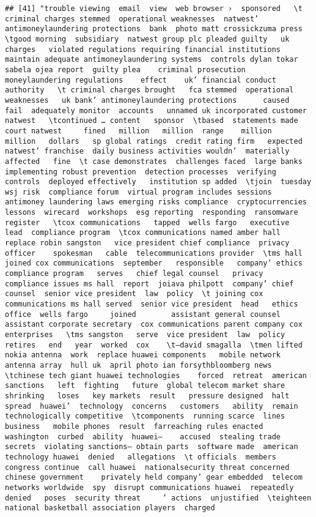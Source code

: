 \documentclass[
]{article}
\begin{document}
\begin{verbatim}
## [41] "trouble viewing  email  view  web browser ›  sponsored   \t criminal charges stemmed  operational weaknesses  natwest’ antimoneylaundering protections  bank  photo matt crossickzuma press  \tgood morning  subsidiary  natwest group plc pleaded guilty   uk  charges   violated regulations requiring financial institutions  maintain adequate antimoneylaundering systems  controls dylan tokar  sabela ojea report  guilty plea    criminal prosecution  moneylaundering regulations    effect    uk’ financial conduct authority   \t criminal charges brought   fca stemmed  operational weaknesses   uk bank’ antimoneylaundering protections      caused   fail  adequately monitor  accounts   unnamed uk incorporated customer natwest   \tcontinued … content   sponsor  \tbased  statements made  court natwest     fined   million   million  range    million   million   dollars   sp global ratings  credit rating firm   expected natwest’ franchise  daily business activities wouldn’  materially affected   fine  \t case demonstrates  challenges faced  large banks  implementing robust prevention  detection processes  verifying   controls  deployed effectively   institution sp added  \tjoin  tuesday   wsj risk  compliance forum  virtual program includes sessions  antimoney laundering laws emerging risks compliance  cryptocurrencies lessons  wirecard  workshops  esg reporting  responding  ransomware register   \tcox communications   tapped  wells fargo   executive  lead  compliance program  \tcox communications named amber hall  replace robin sangston   vice president chief compliance  privacy officer    spokesman   cable  telecommunications provider  \tms hall joined cox communications  september   responsible   company’ ethics  compliance program   serves   chief legal counsel   privacy  compliance issues ms hall  report  joiava philpott  company’ chief counsel  senior vice president  law  policy  \t joining cox communications ms hall served  senior vice president  head   ethics office  wells fargo     joined        assistant general counsel  assistant corporate secretary  cox communications parent company cox enterprises   \tms sangston   serve  vice president  law  policy   retires   end   year  worked  cox    \t—david smagalla  \tmen lifted  nokia antenna  work  replace huawei components   mobile network antenna array  hull uk  april photo ian forsythbloomberg news  \tchinese tech giant huawei technologies    forced  retreat  american sanctions   left  fighting   future  global telecom market share  shrinking   loses   key markets  result   pressure designed  halt  spread  huawei’  technology  concerns   customers   ability  remain technologically competitive  \tcomponents  running scarce  lines  business   mobile phones  result  farreaching rules enacted  washington  curbed  ability  huawei—    accused  stealing trade secrets  violating sanctions— obtain parts  software made  american technology huawei  denied   allegations  \t officials  members  congress continue  call huawei  nationalsecurity threat concerned   chinese government    privately held company’ gear embedded  telecom networks worldwide  spy  disrupt communications huawei  repeatedly denied   poses  security threat     ’ actions  unjustified  \teighteen  national basketball association players  charged   
\end{verbatim}
\end{document}
